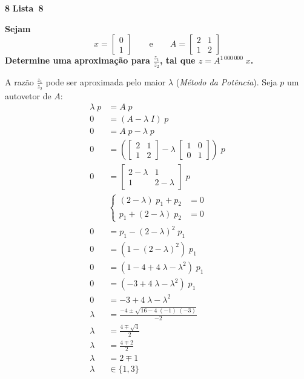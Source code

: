 \documentclass{article}
\newenvironment{question}
    {\medskip\bfseries\large}
    {\medskip}
\newcounter{exe-list}
\newenvironment{exe}[2][Sala]
    {\bigskip\noindent\par\ifthenelse{\equal{#1}{}}%
        {\textbf{\LARGE #2}}%
        {\textbf{\LARGE #1~#2}}%
    \medskip\noindent\par}
    {\bigskip}
\begin{document}
\begin{exe}[Lista]{8}
    \begin{question}
        Sejam
        \[
            x = \begin{bmatrix}
                0 \\ 1
            \end{bmatrix}
            \qquad\text{e}\qquad
            A = \begin{bmatrix}
                2 & 1 \\ 1 & 2
            \end{bmatrix}
        \]
        Determine uma aproximação para \(\frac{z_1}{z_2}\),
        tal que \(z = A^{1 \, 000 \, 000} \; x\).
    \end{question}

    A razão \(\frac{z_1}{z_2}\) pode ser aproximada
    pelo maior \(\lambda\) (\emph{Método da Potência}).
    Seja \(p\) um autovetor de \(A\):
    \begin{align*}
        \lambda \; p &= A \; p \\
        0 &= (A - \lambda \; I) \; p \\
        0 &= A \; p - \lambda \; p \\
        0 &= \left(\begin{bmatrix}
            2 & 1 \\
            1 & 2
        \end{bmatrix} - \lambda \; \begin{bmatrix}
            1 & 0 \\
            0 & 1
        \end{bmatrix}\right) \; p \\
        0 &= \begin{bmatrix}
            2 - \lambda & 1 \\
            1 & 2 - \lambda
        \end{bmatrix} \; p \\
        &\begin{cases}
            (2 - \lambda) \; p_1 + p_2 &= 0 \\
            p_1 + (2 - \lambda) \; p_2 &= 0
        \end{cases} \\
        0 &= p_1 - (2 - \lambda)^2 \; p_1 \\
        0 &= (1 - (2 - \lambda)^2) \; p_1 \\
        0 &= (1 - 4 + 4 \; \lambda - \lambda^2) \; p_1 \\
        0 &= (- 3 + 4 \; \lambda - \lambda^2) \; p_1 \\
        0 &= - 3 + 4 \; \lambda - \lambda^2 \\
        \lambda &= \frac{-4 \pm \sqrt{16 - 4 \; (-1) \; (-3)}}{-2} \\
        \lambda &= \frac{4 \mp \sqrt{4}}{2} \\
        \lambda &= \frac{4 \mp 2}{2} \\
        \lambda &= 2 \mp 1 \\
        \lambda &\in \{ 1, 3 \}
    \end{align*}


\end{exe}
\end{document}
